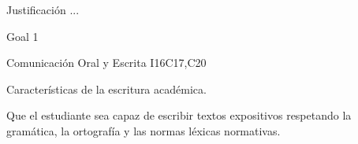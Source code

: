 \begin{syllabus}


\begin{justification}
Justificación ...
\end{justification}

\begin{goals}
\item Goal 1
\end{goals}

\begin{outcomes}
   \item {}
   \item {}
   \item {}
\end{outcomes}

\begin{competences}
    \item {}
    \item {}
    \item {}
\end{competences}

\begin{unit}{Comunicación Oral y Escrita I}{}{16}{C17,C20}
\begin{topics}
      \item Características de la escritura académica.
\end{topics}

\begin{learningoutcomes}
   \item Que el  estudiante sea capaz de escribir textos expositivos respetando la gramática, la ortografía y las normas léxicas normativas.
\end{learningoutcomes}
\end{unit}



\begin{coursebibliography}
\end{coursebibliography}

\end{syllabus}
